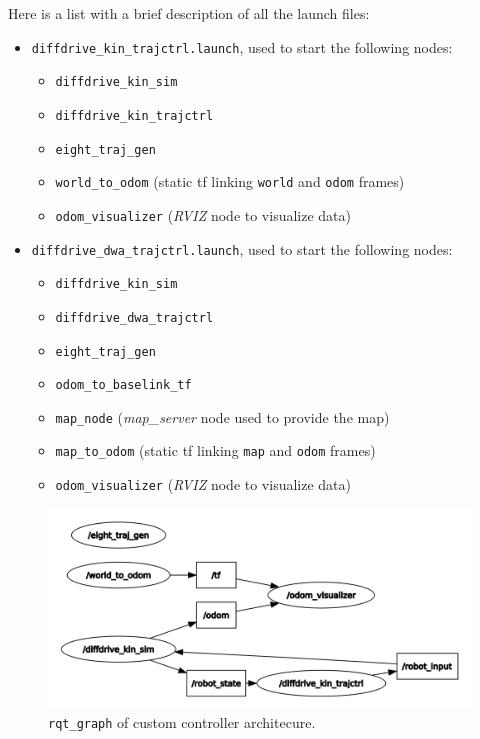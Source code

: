 \documentclass[11pt,a4paper]{article}
\begin{document}
Here is a list with a brief description of all the launch files:\\
\begin{itemize}
    \item \texttt{diffdrive\_kin\_trajctrl.launch}, used to start the following nodes:
        \begin{itemize}
            \item \texttt{diffdrive\_kin\_sim}
            \item \texttt{diffdrive\_kin\_trajctrl}
            \item \texttt{eight\_traj\_gen}
            \item \texttt{world\_to\_odom} (static tf linking \texttt{world} and \texttt{odom} frames)
            \item \texttt{odom\_visualizer} (\textit{RVIZ} node to visualize data)\\
        \end{itemize}

    \item \texttt{diffdrive\_dwa\_trajctrl.launch}, used to start the following nodes:
        \begin{itemize}
            \item \texttt{diffdrive\_kin\_sim}
            \item \texttt{diffdrive\_dwa\_trajctrl}
            \item \texttt{eight\_traj\_gen}
            \item \texttt{odom\_to\_baselink\_tf}
            \item \texttt{map\_node} (\textit{map\_server} node used to provide the map)
            \item \texttt{map\_to\_odom} (static tf linking \texttt{map} and \texttt{odom} frames)
            \item \texttt{odom\_visualizer} (\textit{RVIZ} node to visualize data)
        \end{itemize}
\end{itemize}


\begin{figure}[H]
    \centering
    \includegraphics[scale=0.2]{ros_tools/rqtgraph_custom.png}
    \caption{\texttt{rqt\_graph} of custom controller architecure.}
\end{figure}
\end{document}
